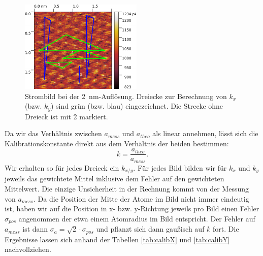 \begin{figure}[H]
\centering
\includegraphics[width=\textwidth]{../Gwyddion/HOPG/2nm_gimped.pdf}
\caption{Strombild bei der \SI{2}{nm}-Auflösung. Dreiecke zur Berechnung von $k_x$ (bzw. $k_y$) sind grün (bzw. blau) eingezeichnet. Die Strecke ohne Dreieck ist mit 2 markiert.}
\label{2nm}
\end{figure}

Da wir das Verhältnis zwischen $a_{mess}$ und $a_{theo}$ als linear annehmen, lässt sich die Kalibrationskonstante direkt aus dem Verhältnis der beiden bestimmen:
\begin{equation}
k = \frac{a_{theo}}{a_{mess}}.
\end{equation}
Wir erhalten so für jedes Dreieck ein $k_{x/y}$. Für jedes Bild bilden wir für $k_x$ und $k_y$ jeweils das gewichtete Mittel inklusive dem Fehler auf den gewichteten Mittelwert. Die einzige Unsicherheit in der Rechnung kommt von der Messung von $a_{mess}$. Da die Position der Mitte der Atome im Bild nicht immer eindeutig ist, haben wir auf die Position in x- bzw. y-Richtung jeweils pro Bild einen Fehler $\sigma_{pos}$ angenommen der etwa einem Atomradius im Bild entspricht. Der Fehler auf $a_{mess}$ ist dann $\sigma_a = \sqrt{2} \cdot \sigma_{pos}$ und pflanzt sich dann gaußisch auf $k$ fort. Die Ergebnisse lassen sich anhand der Tabellen \ref{tab:calibX} und \ref{tab:calibY} nachvollziehen.

